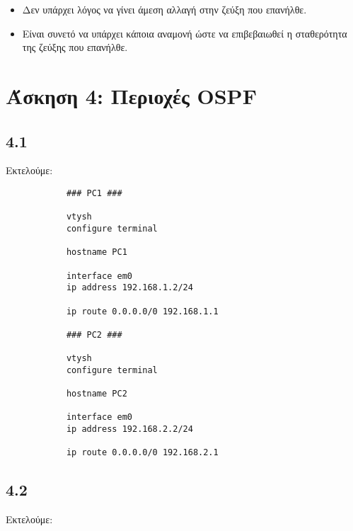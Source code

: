 \documentclass[a4paper, 12pt]{article}
\begin{document}
		\begin{itemize}
			\item Δεν υπάρχει λόγος να γίνει άμεση αλλαγή στην ζεύξη που επανήλθε.
			\item Είναι συνετό να υπάρχει κάποια αναμονή ώστε να επιβεβαιωθεί η σταθερότητα της ζεύξης που επανήλθε.
		\end{itemize}

\section*{Άσκηση 4: Περιοχές OSPF}

	\subsection*{4.1}
		Εκτελούμε:
		
		\begin{verbatim}
			### PC1 ###
			
			vtysh
			configure terminal
			
			hostname PC1
			
			interface em0
			ip address 192.168.1.2/24
			
			ip route 0.0.0.0/0 192.168.1.1
			
			### PC2 ###
			
			vtysh
			configure terminal
			
			hostname PC2
			
			interface em0
			ip address 192.168.2.2/24
			
			ip route 0.0.0.0/0 192.168.2.1
		\end{verbatim}

	\subsection*{4.2}
		Εκτελούμε:
		
\end{document}
